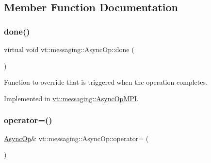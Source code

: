 \subsection{Member Function Documentation}
\mbox{\label{structvt_1_1messaging_1_1_async_op_aadffda7e94c47714e4da172927783583}} 
\subsubsection{\texorpdfstring{done()}{done()}}
{\footnotesize\ttfamily virtual void vt\+::messaging\+::\+Async\+Op\+::done (\begin{DoxyParamCaption}{ }\end{DoxyParamCaption})\hspace{0.3cm}{\ttfamily [pure virtual]}}



Function to override that is triggered when the operation completes. 



Implemented in \hyperlink{structvt_1_1messaging_1_1_async_op_m_p_i_ab4777982f1e845811a2df08ffd3509f0}{vt\+::messaging\+::\+Async\+Op\+M\+PI}.

\mbox{\label{structvt_1_1messaging_1_1_async_op_a3c1338faf527f023000897296ba94170}} 
\subsubsection{\texorpdfstring{operator=()}{operator=()}\hspace{0.1cm}{\footnotesize\ttfamily [1/2]}}
{\footnotesize\ttfamily \hyperlink{structvt_1_1messaging_1_1_async_op}{Async\+Op}\& vt\+::messaging\+::\+Async\+Op\+::operator= (\begin{DoxyParamCaption}\item[{\hyperlink{structvt_1_1messaging_1_1_async_op}{Async\+Op} \&\&}]{ }\end{DoxyParamCaption})\hspace{0.3cm}{\ttfamily [delete]}}

\mbox{\label{structvt_1_1messaging_1_1_async_op_a96df4cbc045ea2a0ebb40f035fff6bcb}} 
